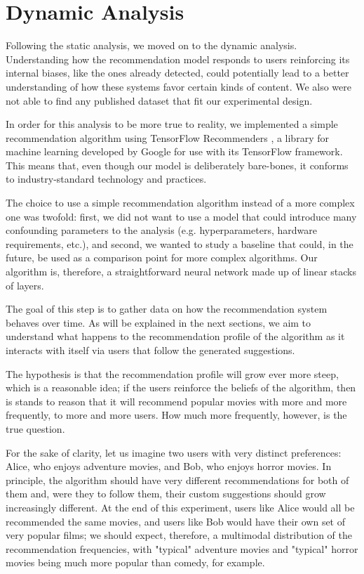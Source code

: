 
\chapter{Dynamic Analysis}
\label{cap:dynamic}

Following the static analysis, we moved on to the dynamic analysis.
Understanding how the recommendation model responds to users reinforcing its
internal biases, like the ones already detected, could potentially lead to a
better understanding of how these systems favor certain kinds of content. We
also were not able to find any published dataset that fit our experimental
design.

In order for this analysis to be more true to reality, we implemented a simple
recommendation algorithm using TensorFlow Recommenders \citep{}, a library for
machine learning developed by Google for use with its TensorFlow \citep{}
framework. This means that, even though our model is deliberately bare-bones, it
conforms to industry-standard technology and practices.

The choice to use a simple recommendation algorithm instead of a more complex
one was twofold: first, we did not want to use a model that could introduce many
confounding parameters to the analysis (e.g. hyperparameters, hardware
requirements, etc.), and second, we wanted to study a baseline that could, in
the future, be used as a comparison point for more complex algorithms. Our
algorithm is, therefore, a straightforward neural network made up of linear
stacks of layers.

The goal of this step is to gather data on how the recommendation system behaves
over time. As will be explained in the next sections, we aim to understand what
happens to the recommendation profile of the algorithm as it interacts with
itself via users that follow the generated suggestions.

The hypothesis is that the recommendation profile will grow ever more steep,
which is a reasonable idea; if the users reinforce the beliefs of the algorithm,
then is stands to reason that it will recommend popular movies with more and
more frequently, to more and more users. How much more frequently, however, is
the true question.

For the sake of clarity, let us imagine two users with very distinct
preferences: Alice, who enjoys adventure movies, and Bob, who enjoys horror
movies. In principle, the algorithm should have very different recommendations
for both of them and, were they to follow them, their custom suggestions should
grow increasingly different. At the end of this experiment, users like Alice
would all be recommended the same movies, and users like Bob would have their
own set of very popular films; we should expect, therefore, a multimodal
distribution of the recommendation frequencies, with "typical" adventure movies
and "typical" horror movies being much more popular than comedy, for example.

